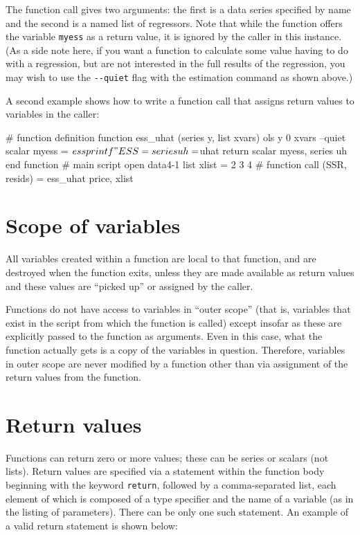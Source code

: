 The function call gives two arguments: the first is a data series
specified by name and the second is a named list of regressors.  Note
that while the function offers the variable \verb+myess+ as a return
value, it is ignored by the caller in this instance.  (As a side note
here, if you want a function to calculate some value having to do with
a regression, but are not interested in the full results of the
regression, you may wish to use the \verb+--quiet+ flag with the
estimation command as shown above.)
    
A second example shows how to write a function call that assigns
return values to variables in the caller:
    
\begin{code}
      # function definition
      function ess_uhat (series y, list xvars)
        ols y 0 xvars --quiet
        scalar myess = $ess
        printf "ESS = %
        series uh = $uhat
        return scalar myess, series uh
      end function
      # main script
      open data4-1
      list xlist = 2 3 4
      # function call
      (SSR, resids) = ess_uhat price, xlist
\end{code}


\section{Scope of variables}
\label{func-scope}

All variables created within a function are local to that function,
and are destroyed when the function exits, unless they are made
available as return values and these values are ``picked up'' or
assigned by the caller.
    
Functions do not have access to variables in ``outer scope'' (that is,
variables that exist in the script from which the function is called)
except insofar as these are explicitly passed to the function as
arguments.  Even in this case, what the function actually gets is a
copy of the variables in question.  Therefore, variables in outer
scope are never modified by a function other than via assignment of
the return values from the function.
    

\section{Return values}
\label{func-return}


Functions can return zero or more values; these can be series or
scalars (not lists).  Return values are specified via a statement
within the function body beginning with the keyword \verb+return+,
followed by a comma-separated list, each element of which is composed
of a type specifier and the name of a variable (as in the listing of
parameters).  There can be only one such statement.  An example of a
valid return statement is shown below:
    
